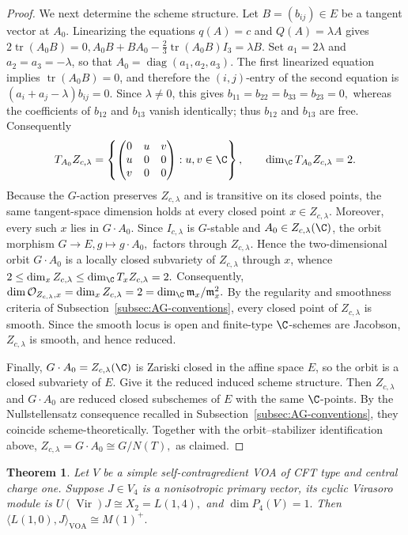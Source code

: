 \documentclass[12pt,leqno]{amsart}
\numberwithin{equation}{section} \newtheorem{thm}{Theorem}[section] \newtheorem{lem}[thm]{Lemma} \newtheorem{ex}[thm]{Example} \newtheorem{prop}[thm]{Proposition} \newtheorem{cor}[thm]{Corollary} \newtheorem{defi}[thm]{Definition} \newtheorem{rmk}[thm]{Remark} \newtheorem{notation}[thm]{Notation}
\newcommand{\Vir}{\operatorname{Vir}}
\begin{document}
\begin{proof}
We next determine the scheme structure. Let $B=(b_{ij})\in E$ be a tangent vector at $A_0$. Linearizing the equations $q(A)=c$ and $Q(A)=\lambda A$ gives \(2\operatorname{tr}(A_0B)=0,A_0B+BA_0-\frac23\operatorname{tr}(A_0B)I_3=\lambda B.\) Set $a_1=2\lambda$ and $a_2=a_3=-\lambda$, so that $A_0=\operatorname{diag}(a_1,a_2,a_3)$. The first linearized equation implies $\operatorname{tr}(A_0B)=0$, and therefore the $(i,j)$-entry of the second equation is \((a_i+a_j-\lambda)b_{ij}=0.\) Since $\lambda\ne0$, this gives \(b_{11}=b_{22}=b_{33}=b_{23}=0,\) whereas the coefficients of $b_{12}$ and $b_{13}$ vanish identically; thus $b_{12}$ and $b_{13}$ are free. Consequently
\[
T_{A_0}Z_{c,\lambda}
=
\left\{
\begin{pmatrix}
0&u&v\\
u&0&0\\
v&0&0
\end{pmatrix}
:u,v\in\C
\right\},
\qquad
\dim_\C T_{A_0}Z_{c,\lambda}=2.
\]
Because the $G$-action preserves $Z_{c,\lambda}$ and is transitive on its closed points, the same tangent-space dimension holds at every closed point $x\in Z_{c,\lambda}$. Moreover, every such $x$ lies in $G\cdot A_0$. Since $I_{c,\lambda}$ is $G$-stable and $A_0\in Z_{c,\lambda}(\C)$, the orbit morphism \(G\longrightarrow E,g\longmapsto g\cdot A_0,\) factors through $Z_{c,\lambda}$. Hence the two-dimensional orbit $G\cdot A_0$ is a locally closed subvariety of $Z_{c,\lambda}$ through $x$, whence \(2\leq\dim_x Z_{c,\lambda}\leq\dim_\C T_xZ_{c,\lambda}=2.\) Consequently, \(\dim\mathcal O_{Z_{c,\lambda},x}=\dim_x Z_{c,\lambda}=2=\dim_\C\mathfrak m_x/\mathfrak m_x^2.\) By the regularity and smoothness criteria of Subsection~\ref{subsec:AG-conventions}, every closed point of $Z_{c,\lambda}$ is smooth. Since the smooth locus is open and finite-type $\C$-schemes are Jacobson, $Z_{c,\lambda}$ is smooth, and hence reduced.

Finally, $ G\cdot A_0=Z_{c,\lambda}(\C) $ is Zariski closed in the affine space \(E\), so the orbit is a closed subvariety of \(E\). Give it the reduced induced scheme structure. Then \(Z_{c,\lambda}\) and \(G\cdot A_0\) are reduced closed subschemes of \(E\) with the same \(\C\)-points. By the Nullstellensatz consequence recalled in Subsection~\ref{subsec:AG-conventions}, they coincide scheme-theoretically. Together with the orbit--stabilizer identification above, $ Z_{c,\lambda}=G\cdot A_0\cong G/N(T), $ as claimed.
\end{proof}

\begin{thm}\label{thm:M1plus-core}
Let $V$ be a simple self-contragredient VOA of CFT type and central charge one. Suppose $J\in V_4$ is a nonisotropic primary vector, its cyclic Virasoro module is \(U(\Vir)J\cong X_2=L(1,4),\) and \(\dim P_4(V)=1.\) Then \(\langle L(1,0),J\rangle_{\mathrm{VOA}}\cong M(1)^+.\)
\end{thm}
\end{document}
